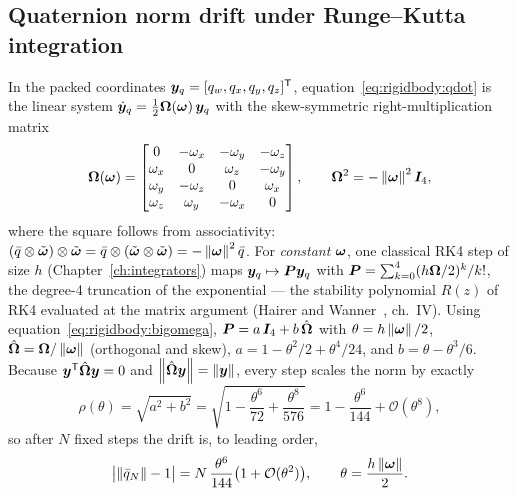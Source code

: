 \subsection{Quaternion norm drift under Runge--Kutta integration}
\label{sec:rigidbody:normdrift}

In the packed coordinates $\bm{y}_q = [q_w, q_x, q_y, q_z]^{\mathsf T}$,
equation~\eqref{eq:rigidbody:qdot} is the linear system $\dot{\bm{y}}_q =
\tfrac{1}{2}\bm{\Omega}(\bm{\omega})\,\bm{y}_q$ with the skew-symmetric
right-multiplication matrix
\begin{equation}
  \bm{\Omega}(\bm{\omega}) =
  \begin{bmatrix}
    0 & -\omega_x & -\omega_y & -\omega_z \\
    \omega_x & 0 & \omega_z & -\omega_y \\
    \omega_y & -\omega_z & 0 & \omega_x \\
    \omega_z & \omega_y & -\omega_x & 0
  \end{bmatrix},
  \qquad
  \bm{\Omega}^2 = -\left\lVert \bm{\omega} \right\rVert^2 \bm{I}_4 ,
  \label{eq:rigidbody:bigomega}
\end{equation}
where the square follows from associativity: $(\bar{q} \otimes
\tilde{\bm{\omega}}) \otimes \tilde{\bm{\omega}} = \bar{q} \otimes
(\tilde{\bm{\omega}} \otimes \tilde{\bm{\omega}}) =
-\left\lVert \bm{\omega} \right\rVert^2 \bar{q}$. For \emph{constant} $\bm{\omega}$, one
classical RK4 step of size $h$ (Chapter~\ref{ch:integrators}) maps
$\bm{y}_q \mapsto \bm{P}\bm{y}_q$ with $\bm{P} = \sum_{k=0}^{4}
(h\bm{\Omega}/2)^k / k!$, the degree-4 truncation of the exponential ---
the stability polynomial $R(z)$ of RK4 evaluated at the matrix argument
(Hairer and Wanner~\cite{hairer1996}, ch.~IV). Using
equation~\eqref{eq:rigidbody:bigomega}, $\bm{P} = a\,\bm{I}_4 +
b\,\hat{\bm{\Omega}}$ with $\theta = h\left\lVert \bm{\omega} \right\rVert/2$,
$\hat{\bm{\Omega}} = \bm{\Omega}/\left\lVert \bm{\omega} \right\rVert$ (orthogonal and
skew), $a = 1 - \theta^2/2 + \theta^4/24$, and $b = \theta - \theta^3/6$.
Because $\bm{y}^{\mathsf T}\hat{\bm{\Omega}}\bm{y} = 0$ and
$\left\lVert \hat{\bm{\Omega}}\bm{y} \right\rVert = \left\lVert \bm{y} \right\rVert$, every step scales the
norm by exactly
\begin{equation}
  \rho(\theta) = \sqrt{a^2 + b^2}
    = \sqrt{1 - \frac{\theta^6}{72} + \frac{\theta^8}{576}}
    = 1 - \frac{\theta^6}{144} + \mathcal{O}(\theta^8),
  \label{eq:rigidbody:rk4norm}
\end{equation}
so after $N$ fixed steps the drift is, to leading order,
\begin{equation}
  \bigl|\left\lVert \bar{q}_N \right\rVert - 1\bigr|
    = N\,\frac{\theta^6}{144}
      \bigl(1 + \mathcal{O}(\theta^2)\bigr),
  \qquad
  \theta = \frac{h \left\lVert \bm{\omega} \right\rVert}{2} .
  \label{eq:rigidbody:normdrift}
\end{equation}

